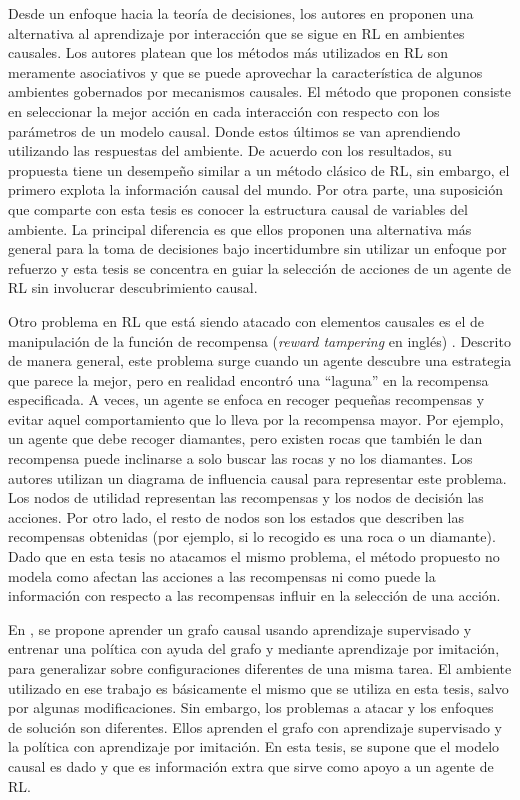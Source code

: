 Desde un enfoque hacia la teoría de decisiones, los autores en \cite{playingagainstnature2018, gonzalezsoto2019von} proponen una alternativa al aprendizaje por interacción que se sigue en RL en ambientes causales. Los autores platean que los métodos más utilizados en RL son meramente asociativos y que se puede aprovechar la característica de algunos ambientes gobernados por mecanismos causales. El método que proponen consiste en seleccionar la mejor acción 
	en cada interacción con respecto con los parámetros de un modelo causal. Donde estos últimos se van aprendiendo utilizando las respuestas del ambiente. De acuerdo con los resultados, su propuesta tiene un desempeño similar a un método clásico de RL, sin embargo, el primero explota la información causal del mundo. Por otra parte, una suposición que comparte con esta tesis es conocer la estructura causal de variables del ambiente. La principal diferencia es que ellos proponen una alternativa más general para la toma de decisiones bajo incertidumbre sin utilizar un enfoque por refuerzo y esta tesis se concentra en guiar la selección de acciones de un agente de RL sin involucrar descubrimiento causal.

Otro problema en RL que está siendo atacado con elementos causales es el de manipulación de la función de recompensa (\textit{reward tampering} en inglés) \cite{everitt2019reward}. Descrito de manera general, este problema surge cuando un agente descubre una estrategia que parece la mejor, pero en realidad encontró una ``laguna'' en la recompensa especificada. A veces, un agente se enfoca en recoger pequeñas recompensas y evitar aquel comportamiento que lo lleva por la recompensa mayor. Por ejemplo, un agente que debe recoger diamantes, pero existen rocas que también le dan recompensa puede inclinarse a solo buscar las rocas y no los diamantes. Los autores utilizan un diagrama de influencia causal para representar este problema. Los nodos de utilidad representan las recompensas y los nodos de decisión las acciones. Por otro lado, el resto de nodos son los estados que describen las recompensas obtenidas (por ejemplo, si lo recogido es una roca o un diamante).
Dado que en esta tesis no atacamos el mismo problema, el método propuesto no modela como afectan las acciones a las recompensas ni como puede la información con respecto a las recompensas influir en la selección de una acción.

En \cite{nair2019causal}, se propone
aprender un grafo causal usando aprendizaje supervisado y
entrenar una política con ayuda del grafo y mediante aprendizaje por imitación, para generalizar sobre 
configuraciones diferentes de una misma
tarea.
El ambiente utilizado en ese trabajo es básicamente el mismo que se utiliza en esta
tesis, salvo por algunas modificaciones. Sin embargo, los problemas a atacar y los enfoques
de solución son diferentes. Ellos aprenden el grafo con aprendizaje supervisado y
la política con aprendizaje por imitación. En esta tesis, se supone que
el modelo causal es dado y que es información extra que sirve como apoyo a un agente de RL.


